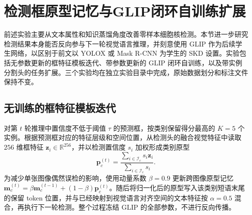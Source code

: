\begin{table}[t]
\caption{学生网络结构对比}
\label{tab:attrip_architecture}
\begin{center}
\end{center}
\vskip -0.15in
\end{table}
\section{检测框原型记忆与GLIP闭环自训练扩展}

前述实验主要从文本属性和知识蒸馏角度改善零样本细胞核检测。本节进一步研究检测结果本身能否反向参与下一轮视觉语言推理，并刻意使用 GLIP 作为后续学生网络，以区别于前文以 YOLOX 或 Mask R-CNN 为学生的 SKD 设置。实验包括无参数更新的框特征模板迭代、带参数更新的 GLIP 闭环自训练，以及带实例分割头的任务扩展。三个实验均在独立实验目录中完成，原始数据划分和标注文件保持不变。

\subsection{无训练的框特征模板迭代}

对第 $t$ 轮推理中置信度不低于阈值 $\tau$ 的预测框，按类别保留得分最高的 $K=5$ 个实例。根据预测框对应的特征层级和空间位置，从检测头的融合视觉特征中读取 $256$ 维框特征 $\boldsymbol z_i\in\mathbb{R}^{256}$，并以检测置信度 $s_i$ 加权形成类别原型
\begin{equation}
\boldsymbol p_c^{(t)}=\frac{\sum_{i\in\mathcal I_c}s_i\boldsymbol z_i}{\sum_{i\in\mathcal I_c}s_i}.
\end{equation}
为减少单张图像偶然误检的影响，使用动量系数 $\beta=0.9$ 更新跨图像原型记忆 $\boldsymbol m_c^{(t)}=\beta\boldsymbol m_c^{(t-1)}+(1-\beta)\boldsymbol p_c^{(t)}$。随后将归一化后的原型写入该类别短语末尾的保留 token 位置，并与已经映射到视觉语言对齐空间的文本特征按 $\alpha=0.5$ 混合，再执行下一轮检测。整个过程冻结 GLIP 的全部参数，不进行反向传播。

